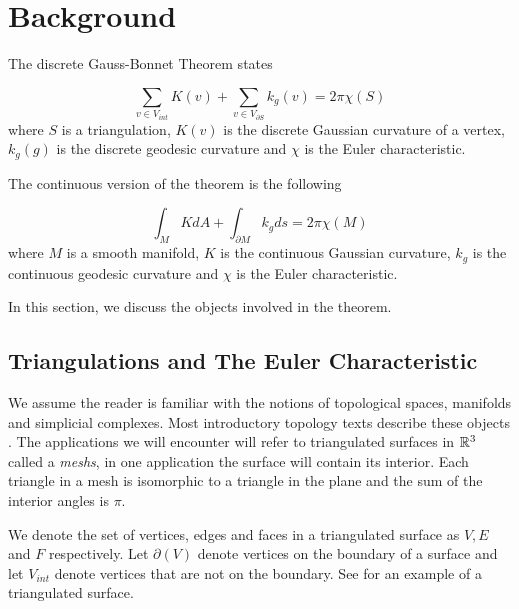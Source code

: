 \section{Background}\label{sec:background}
\label{sec:cast}
The discrete Gauss-Bonnet Theorem states

\begin{theorem} \label{thm:g-b-d}

$$\sum_{v\in V_{int}} K(v) + \sum_{v\in V_{\partial S}} k_g(v) = 2\pi \chi(S)$$
where $S$ is a triangulation, $K(v)$ is the discrete Gaussian curvature
of a vertex, $k_g(g)$ is the discrete geodesic curvature and
$\chi$ is the Euler characteristic.
\end{theorem}

The continuous version of the theorem is the following

\begin{theorem} \label{thm:g-b-c}

$$\int_{M} K dA+ \int_{\partial M} k_g ds = 2\pi \chi(M)$$
where $M$ is a smooth manifold, $K$ is the continuous Gaussian curvature,
 $k_g$ is the continuous geodesic curvature and
$\chi$ is the Euler characteristic.
\end{theorem}
In this section, we discuss the objects involved in the theorem.





\subsection{Triangulations and The Euler Characteristic}

We assume the reader is familiar with the notions
of topological spaces, manifolds and simplicial complexes.
Most introductory topology texts describe these objects \cite{jm08,munkres}.
The applications we will encounter will refer to triangulated surfaces in $\mathbb{R}^3$
called a \emph{meshs}, in one application the surface will contain its interior.
Each triangle in a mesh is isomorphic to a triangle in the plane and the sum
of the interior angles is $\pi$.


We denote the set of vertices, edges and faces in a triangulated surface as 
$V, E$ and $F$ respectively.
Let $\partial(V)$ denote vertices on the boundary of a surface and let $V_{int}$ 
denote vertices that are not on the boundary.
See  for an example of a triangulated surface.



